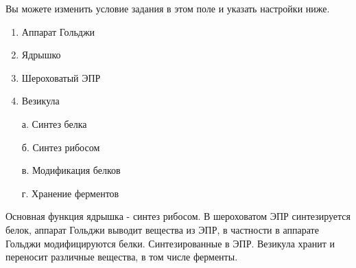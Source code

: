 
Вы можете изменить условие задания в этом поле и указать настройки ниже.

\begin{multicols}{2}
    {
        \begin{enumerate}
            \item Аппарат Гольджи
            \item Ядрышко
            \item Шероховатый ЭПР
            \item Везикула
        \end{enumerate}
    }
    {
        \begin{enumerate}
            \item[а.] Синтез белка
            \item[б.] Синтез рибосом
            \item[в.] Модификация белков
            \item[г.] Хранение ферментов
        \end{enumerate}
    }
\end{multicols}

\explanationSection

Основная функция ядрышка - синтез рибосом. В шероховатом ЭПР синтезируется белок, аппарат Гольджи выводит вещества из ЭПР, в частности в аппарате Гольджи модифицируются белки. Синтезированные в ЭПР. Везикула хранит и переносит различные вещества, в том числе ферменты.

